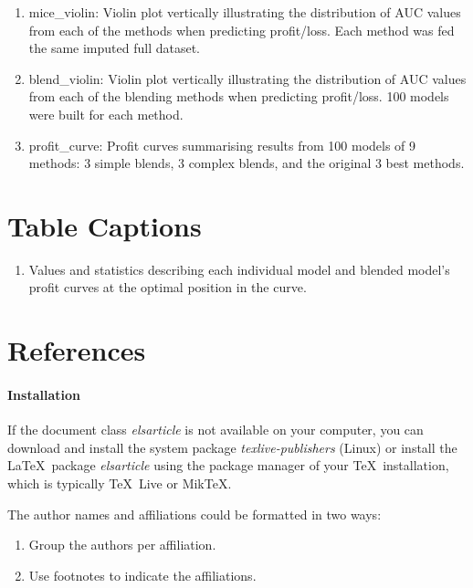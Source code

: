 \documentclass[]{elsarticle} %
\providecommand{\tightlist}{%
  \setlength{\itemsep}{0pt}\setlength{\parskip}{0pt}}
\begin{document}
\begin{enumerate}
\def\labelenumi{\arabic{enumi}.}
\tightlist
\item
  mice\_violin: Violin plot vertically illustrating the distribution of
  AUC values from each of the methods when predicting profit/loss. Each
  method was fed the same imputed full dataset.
\item
  blend\_violin: Violin plot vertically illustrating the distribution of
  AUC values from each of the blending methods when predicting
  profit/loss. 100 models were built for each method.
\item
  profit\_curve: Profit curves summarising results from 100 models of 9
  methods: 3 simple blends, 3 complex blends, and the original 3 best
  methods.
\end{enumerate}

\section{Table Captions}\label{table-captions}

\begin{enumerate}
\def\labelenumi{\arabic{enumi}.}
\tightlist
\item
  Values and statistics describing each individual model and blended
  model's profit curves at the optimal position in the curve.
\end{enumerate}

\section*{References}\label{references}

\paragraph{Installation}\label{installation}

If the document class \emph{elsarticle} is not available on your
computer, you can download and install the system package
\emph{texlive-publishers} (Linux) or install the LaTeX~package
\emph{elsarticle} using the package manager of your TeX~installation,
which is typically TeX~Live or MikTeX.

The author names and affiliations could be formatted in two ways:

\begin{enumerate}
\def\labelenumi{(\arabic{enumi})}
\item
  Group the authors per affiliation.
\item
  Use footnotes to indicate the affiliations.
\end{enumerate}
\end{document}
